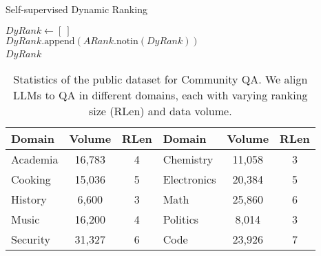 \begin{algorithm}[t]
\caption{Self-supervised Dynamic Ranking}
\label{algo1}
$DyRank \gets [ \ ]$ \\
$DyRank.\text{append}(ARank.\text{notin}(DyRank))$ \\
\Return $DyRank$\ 
\end{algorithm}
\begin{table}[h]
\centering
\renewcommand{\arraystretch}{1.1}
\tabcolsep=0.025cm
\begin{tabular}{lcc|lcc}
\toprule
Domain & Volume & RLen & Domain & Volume & RLen \\ 
\midrule
Academia & 16,783 & 4 & Chemistry & 11,058 & 3 \\ 
Cooking & 15,036 & 5 & Electronics & 20,384 & 5 \\ 
History & 6,600 & 3 & Math & 25,860 & 6 \\ 
Music & 16,200 & 4 & Politics & 8,014 & 3 \\ 
Security & 31,327 & 6 & Code & 23,926 & 7 \\ 
\bottomrule
\end{tabular}
\caption{Statistics of the public dataset for Community QA. We align LLMs to QA in different domains, each with varying ranking size (RLen) and data volume.}
\label{domain}
\vspace{-0.2cm}
\end{table}
